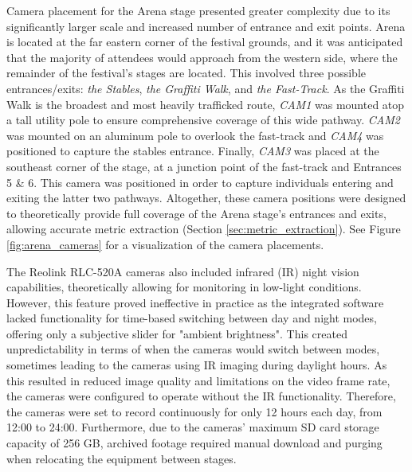 Camera placement for the Arena stage presented greater complexity due to its significantly larger scale and increased number of entrance and exit points. Arena is located at the far eastern corner of the festival grounds, and it was anticipated that the majority of attendees would approach from the western side, where the remainder of the festival's stages are located. This involved three possible entrances/exits: \textit{the Stables}, \textit{the Graffiti Walk}, and \textit{the Fast-Track}. As the Graffiti Walk is the broadest and most heavily trafficked route, \textit{CAM1} was mounted atop a tall utility pole to ensure comprehensive coverage of this wide pathway. \textit{CAM2} was mounted on an aluminum pole to overlook the fast-track and \textit{CAM4} was positioned to capture the stables entrance. Finally, \textit{CAM3} was placed at the southeast corner of the stage, at a junction point of the fast-track and Entrances 5 \& 6. This camera was positioned in order to capture individuals entering and exiting the latter two pathways. Altogether, these camera positions were designed to theoretically provide full coverage of the Arena stage's entrances and exits, allowing accurate metric extraction (Section \ref{sec:metric_extraction}). See Figure \ref{fig:arena_cameras} for a visualization of the camera placements.

The Reolink RLC-520A cameras also included infrared (IR) night vision capabilities, theoretically allowing for monitoring in low-light conditions. However, this feature proved ineffective in practice as the integrated software lacked functionality for time-based switching between day and night modes, offering only a subjective slider for "ambient brightness". This created unpredictability in terms of when the cameras would switch between modes, sometimes leading to the cameras using IR imaging during daylight hours. As this resulted in reduced image quality and limitations on the video frame rate, the cameras were configured to operate without the IR functionality. Therefore, the cameras were set to record continuously for only 12 hours each day, from 12:00 to 24:00. Furthermore, due to the cameras' maximum SD card storage capacity of 256 GB, archived footage required manual download and purging when relocating the equipment between stages.

